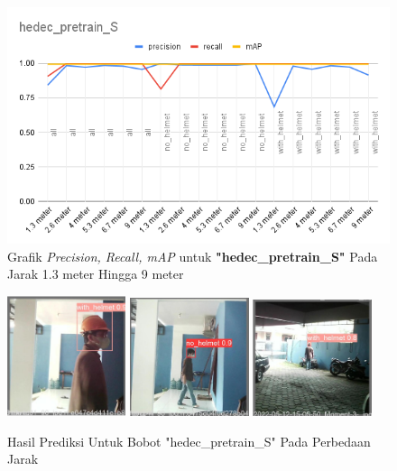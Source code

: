\begin{enumerate}
  \begin{figure}[h!]
    \centering
    \includegraphics[width=1\textwidth]{gambar/BerdasarkanJarak/hedec_pretrain_S.png}
    \caption{Grafik \emph{Precision, Recall, mAP} untuk \textbf{"hedec\_pretrain\_S"} Pada Jarak 1.3 meter Hingga 9 meter}
    \label{fig:grafvaljarak_hedec_pretrain_S}  
  \end{figure}

  \begin{figure} [h!]
    \centering
    \includegraphics[width=0.31\textwidth]{gambar/BerdasarkanJarak_v2/val_hedec_pretrain_S/Jarak1_3/val_batch0_pred.jpg}
    \includegraphics[width=0.31\textwidth]{gambar/BerdasarkanJarak_v2/val_hedec_pretrain_S/Jarak5_3/val_batch0_pred.jpg}
    \includegraphics[width=0.31\textwidth]{gambar/BerdasarkanJarak_v2/val_hedec_pretrain_S/Jarak9/val_batch0_pred.jpg}
    \caption{Hasil Prediksi Untuk Bobot "hedec\_pretrain\_S" Pada Perbedaan Jarak}
    \label{fig:valjarak_sample_hedec_pretrain_S}  
  \end{figure}


\end{enumerate}
